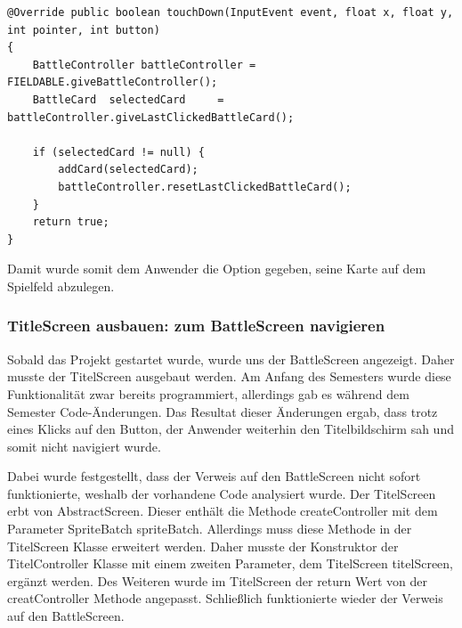 \begin{lstlisting}
@Override public boolean touchDown(InputEvent event, float x, float y, int pointer, int button)
{
    BattleController battleController = FIELDABLE.giveBattleController();
    BattleCard  selectedCard     = battleController.giveLastClickedBattleCard();

    if (selectedCard != null) {
        addCard(selectedCard);
        battleController.resetLastClickedBattleCard();
    }
    return true;
}
\end{lstlisting}

Damit wurde somit dem Anwender die Option gegeben, seine Karte auf dem Spielfeld abzulegen. 

\subsubsection{TitleScreen ausbauen: zum BattleScreen navigieren}
Sobald das Projekt gestartet wurde, wurde uns der BattleScreen angezeigt. Daher musste der TitelScreen ausgebaut werden. Am Anfang des Semesters wurde diese Funktionalität zwar bereits programmiert, allerdings gab es während dem Semester Code-Änderungen. Das Resultat dieser Änderungen ergab, dass trotz eines Klicks auf den Button, der Anwender weiterhin den Titelbildschirm sah und somit nicht navigiert wurde. 

Dabei wurde festgestellt, dass der Verweis auf den BattleScreen nicht sofort funktionierte, weshalb der vorhandene Code analysiert wurde. Der TitelScreen erbt von AbstractScreen. Dieser enthält die Methode createController mit dem Parameter SpriteBatch spriteBatch. Allerdings muss diese Methode in der TitelScreen Klasse erweitert werden. Daher musste der Konstruktor der TitelController Klasse mit einem zweiten Parameter, dem TitelScreen titelScreen, ergänzt werden. Des Weiteren wurde im TitelScreen der return Wert von der creatController Methode angepasst. Schließlich funktionierte wieder der Verweis auf den BattleScreen. 

